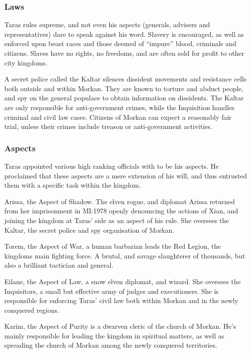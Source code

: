 \subsubsection{Laws}

Taras rules supreme, and not even his aspects (generals, advisers and
representatives) dare to speak against his word. Slavery is encouraged, as well
as enforced upon beast races and those deemed of ``impure'' blood, criminals
and citizens. Slaves have no rights, no freedoms, and are often sold for
profit to other city kingdoms.

A secret police called the Kaltar silences dissident movements and resistance
cells both outside and within Morkan. They are known to torture and abduct
people, and spy on the general populace to obtain information on dissidents.
The Kaltar are only responsible for anti-government crimes, while the
Inquisition handles criminal and civil law cases. Citizens of Morkan can
expect a reasonably fair trial, unless their crimes include treason or
anti-government activities.

\subsubsection{Aspects}

Taras appointed various high ranking officials with to be his aspects. He
proclaimed that these aspects are a mere extension of his will, and thus
entrusted them with a specific task within the kingdom.

Arissa, the Aspect of Shadow. The elven rogue, and diplomat Arissa returned
from her imprisonment in MI:1978 openly denouncing the actions of Xian, and
joining the kingdom at Taras' side as an aspect of his rule. She oversees the
Kaltar, the secret police and spy organisation of Morkan.

Torem, the Aspect of War, a human barbarian leads the Red Legion, the kingdoms
main fighting force. A brutal, and savage slaughterer of thousands, but also a
brilliant tactician and general.

Eilane, the Aspect of Law, a snow elven diplomat, and wizard. She oversees the
Inquisitors, a small but effective army of judges and executioners. She is
responsible for enforcing Taras' civil law both within Morkan and in the newly
conquered regions.

Karim, the Aspect of Purity is a dwarven cleric of the church of Morkan. He's
mainly responsible for leading the kingdom in spiritual matters, as well as
spreading the church of Morkan among the newly conquered territories.

